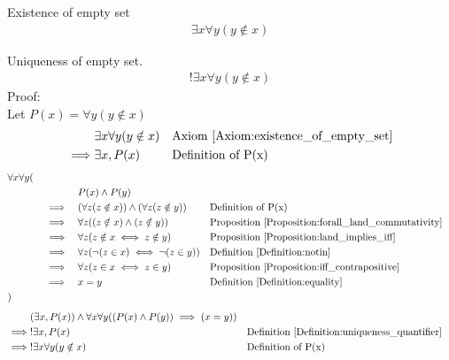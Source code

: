 \begin{axm}
\label{Axiom:existence_of_empty_set}
Existence of empty set
\begin{align*}
\exists x \forall y (y \notin x)
\end{align*}
\end{axm}

\begin{prop}
\label{Proposition:uniqueness_of_empty_set}
Uniqueness of empty set.
\begin{align*}
!\exists x \forall y (y \notin x)
\end{align*}
Proof: \\
Let $P(x) = \forall y (y \notin x)$
\begin{align*}
& \exists x \forall y (y \notin x) && \text{Axiom \ref{Axiom:existence_of_empty_set}} \\
\implies & \exists x, P(x) && \text{Definition of P(x)}
\end{align*}
\begin{align*}
& \forall x \forall y ( \\
& \quad && &&  P(x) \land P(y) \\
& \quad && \implies &&  (\forall z (z \notin x)) \land (\forall z (z \notin y))
&& \text{Definition of P(x)} \\
& \quad && \implies && \forall z ((z \notin x) \land (z \notin y))
&& \text{Proposition \ref{Proposition:forall_land_commutativity}} \\
& \quad && \implies && \forall z (z \notin x \iff z \notin y)
&& \text{Proposition \ref{Proposition:land_implies_iff}} \\
& \quad && \implies && \forall z (\lnot(z \in x) \iff \lnot (z \in y))
&& \text{Definition \ref{Definition:notin}} \\
& \quad && \implies && \forall z (z \in x \iff z \in y)
&& \text{Proposition \ref{Proposition:iff_contrapositive}} \\
& \quad && \implies && x = y
&& \text{Definition \ref{Definition:equality}} \\
& )
\end{align*}
\begin{align*}
& (\exists x, P(x)) \land \forall x \forall y ( (P(x) \land P(y)) \implies (x=y) ) \\
\implies & !\exists x, P(x) && \text{Definition \ref{Definition:uniqueness_quantifier}} \\
\implies & !\exists x \forall y (y \notin x) && \text{Definition of P(x)} \\
\end{align*}
\end{prop}

